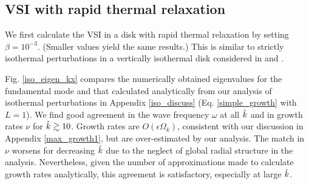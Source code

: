 \subsection{VSI with rapid thermal relaxation}\label{vertiso_pertiso} 
We first calculate the VSI in a disk with rapid thermal relaxation by
setting $\beta=10^{-3}$. (Smaller values yield the same results.) This
is similar to strictly isothermal perturbations in a vertically
isothermal disk considered in \cite{nelson13} and \cite{mcnally14}. %

Fig. \ref{iso_eigen_kx} compares the numerically obtained eigenvalues 
for the fundamental mode and that calculated analytically from our
analysis of isothermal perturbations in Appendix \ref{iso_discuss}
(Eq. \ref{simple_growth} with $L=1$). We find good agreement in the
wave frequency $\omega$ at all $\hat{k}$ and in growth rates $\nu$ for
$\hat{k}\gtrsim 10$. Growth rates are $O(\epsilon\Omega_k)$, 
consistent with our discussion in Appendix \ref{max_growth1}, but
are over-estimated by our analysis. The match in $\nu$ worsens for
decreasing $\hat{k}$ due to the neglect of global radial structure in
the  analysis. Nevertheless, given the number of approximations made
to calculate growth rates analytically, this agreement is
satisfactory, especially at large $\hat{k}$.   

